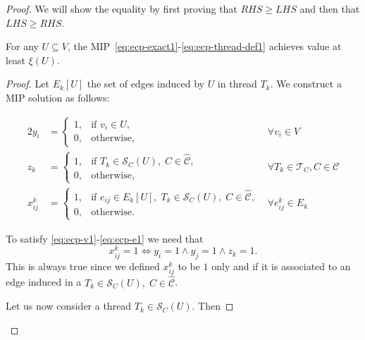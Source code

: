 \begin{proof}
	We will show the equality by first proving that $RHS \geq LHS$ and then
	that $LHS \geq RHS$.

	\begin{claim}
		\label{th:claim-v-b-xi}
		For any $U \subseteq V$, the
		MIP~\eqref{eq:ecp-exact1}-\eqref{eq:ecp-thread-def1} achieves value at
		least $\xi(U)$.
	\end{claim}

	\begin{proof}
		Let $E_k[U]$ the set of edges induced by $U$ in thread $T_k$. We
		construct a MIP solution as follows:

		\begin{alignat}{2}
			\label{eq:ecpp-y}
			y_i        & = \begin{cases}
				1, & \text{if } v_{i} \in U, \\
				0, & \text{otherwise,}
			\end{cases} & \forall v_i \in V                                \\
			\label{eq:ecpp-z}
			z_k        & = \begin{cases}
				1, & \text{if } T_{k} \in \mathcal{S}_C(U), \; C \in
				\mathcal{\hat{C}} ,                                  \\
				0, & \text{otherwise,}
			\end{cases} & \forall T_k \in \mathcal{T}_C, C \in \mathcal{C} \\
			\label{eq:ecpp-x}
			x_{ij}^{k} & = \begin{cases}
				1, & \text{if } e_{ij} \in E_{k}[U], \; T_{k} \in \mathcal{S}_C(U), \; C \in
				\mathcal{\hat{C}},                                                           \\
				0, & \text{otherwise.}
			\end{cases} & \forall e_{ij}^k \in E_k
		\end{alignat}

		To satisfy \eqref{eq:ecp-v1}-\eqref{eq:ecp-e1} we need that
		\begin{equation}
			\label{eq:ecpp-x-iff}
			x_{ij}^{k} = 1 \iff y_i = 1 \land y_j = 1 \land z_k = 1.
		\end{equation}
		This is always true since we defined $x_{ij}^{k}$ to be $1$ only and if it
		is associated to an edge induced in a $T_k \in \mathcal{S}_C(U), \; C \in
			\mathcal{\hat{C}} $.

		Let us now consider a thread $T_k \in \mathcal{S}_C(U)$. Then


\end{proof}
\end{proof}
